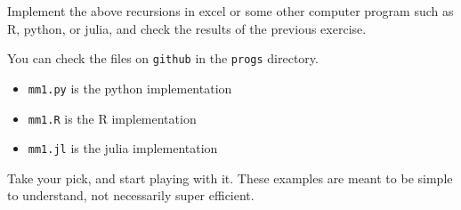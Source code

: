 \begin{question}
  Implement the above recursions in excel or some other computer
  program such as R, python, or julia, and check the results of the
  previous exercise.
    \begin{solution}
      You can check the files on \texttt{github} in the \texttt{progs}
      directory.
\begin{itemize}
\item \texttt{mm1.py} is the python implementation
\item \texttt{mm1.R} is the R implementation
\item \texttt{mm1.jl} is the julia implementation
\end{itemize}
Take your pick, and start playing with it. These examples are meant to
be simple to understand, not necessarily super efficient.
\end{solution}
\end{question}


